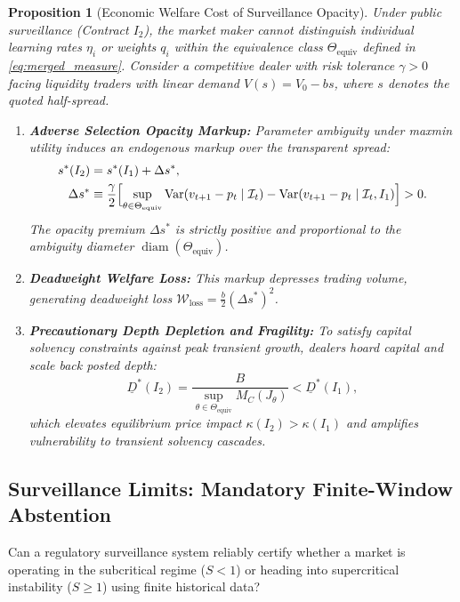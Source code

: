 \documentclass[12pt]{article}
\newtheorem{proposition}[theorem]{Proposition}
\theoremstyle{definition}
\theoremstyle{remark}
\newcommand{\Var}{\operatorname{Var}}
\begin{document}
\begin{proposition}[Economic Welfare Cost of Surveillance Opacity]
\label{thm:welfare_opacity}
Under public surveillance (Contract $I_2$), the market maker cannot distinguish individual learning rates $\eta_i$ or weights $q_i$ within the equivalence class $\Theta_{\text{equiv}}$ defined in \eqref{eq:merged_measure}. Consider a competitive dealer with risk tolerance $\gamma > 0$ facing liquidity traders with linear demand $V(s) = V_0 - b s$, where $s$ denotes the quoted half-spread.
\begin{enumerate}
    \item \textbf{Adverse Selection Opacity Markup:} Parameter ambiguity under maxmin utility \citep{gilboa1989maxmin} induces an endogenous markup over the transparent spread:
    \begin{align}
    s^*(I_2) &= s^*(I_1) + \Delta s^*, \label{eq:opacity_spread_markup} \\
    \Delta s^* &\equiv \frac{\gamma}{2} \Bigl[ \sup_{\theta \in \Theta_{\text{equiv}}} \Var(v_{t+1} - p_t \mid \mathcal{I}_t) - \Var(v_{t+1} - p_t \mid \mathcal{I}_t, I_1) \Bigr] > 0. \notag
    \end{align}
    The opacity premium $\Delta s^*$ is strictly positive and proportional to the ambiguity diameter $\operatorname{diam}(\Theta_{\text{equiv}})$.
    \item \textbf{Deadweight Welfare Loss:} This markup depresses trading volume, generating deadweight loss $\mathcal{W}_{\text{loss}} = \frac{b}{2} (\Delta s^*)^2$.
    \item \textbf{Precautionary Depth Depletion and Fragility:} To satisfy capital solvency constraints against peak transient growth, dealers hoard capital and scale back posted depth:
    \begin{equation}
    \underline{D}^*(I_2) = \frac{B}{\sup_{\theta \in \Theta_{\text{equiv}}} M_C(J_\theta)} < \underline{D}^*(I_1),
    \end{equation}
    which elevates equilibrium price impact $\kappa(I_2) > \kappa(I_1)$ and amplifies vulnerability to transient solvency cascades.
\end{enumerate}
\end{proposition}

\subsection{Surveillance Limits: Mandatory Finite-Window Abstention}
Can a regulatory surveillance system reliably certify whether a market is operating in the subcritical regime ($S < 1$) or heading into supercritical instability ($S \ge 1$) using finite historical data?
\end{document}
